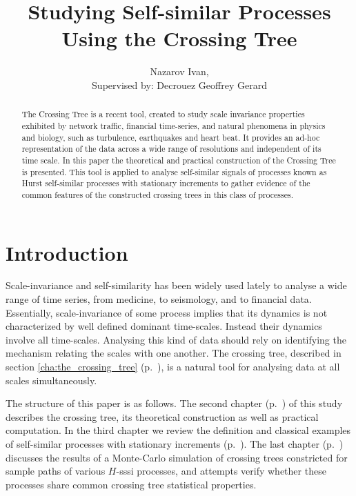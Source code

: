 \documentclass[a4paper]{extreport}
\title{Studying Self-similar Processes Using the Crossing Tree}
\author{Nazarov Ivan, \rus{101мНОД(ИССА)}\\
	{\small Supervised by: Decrouez Geoffrey Gerard}}
\begin{document}
\maketitle
\begin{abstract}
The Crossing Tree is a recent tool, created to study scale invariance properties
exhibited by network traffic, financial time-series, and natural phenomena in physics
and biology, such as turbulence, earthquakes and heart beat. It provides an ad-hoc
representation of the data across a wide range of resolutions and independent of
its time scale. In this paper the theoretical and practical construction of the Crossing
Tree is presented. This tool is applied to analyse self-similar signals of processes
known as Hurst self-similar processes with stationary increments to gather evidence 
of the common features of the constructed crossing trees in this class of processes.
\end{abstract}
\tableofcontents

\chapter{Introduction} %
\label{cha:introduction}

Scale-invariance and self-similarity has been widely used lately to analyse a wide
range of time series, from medicine, to seismology, and to financial data.
Essentially, scale-invariance of some process implies that its dynamics is not
characterized by well defined dominant time-scales. Instead their dynamics
involve all time-scales. Analysing this kind of data should rely on identifying
the mechanism relating the scales with one another. The crossing tree, described in
section \ref{cha:the_crossing_tree} (p.~\pageref{cha:the_crossing_tree}), is
a natural tool for analysing data at all scales simultaneously.

The structure of this paper is as follows. The second chapter (p.~\pageref{cha:the_crossing_tree})
of this study describes the crossing tree, its theoretical construction as well
as practical computation. In the third chapter we review the definition and classical
examples of self-similar processes with stationary increments (p.~\pageref{cha:h_sssi_processes}).
The last chapter (p.~\pageref{cha:the_crossing_tree_and_h_sssi_processes}) discusses
the results of a Monte-Carlo simulation of crossing trees constricted for sample
paths of various $H$-sssi processes, and attempts verify whether these processes
share common crossing tree statistical properties.
\end{document}
